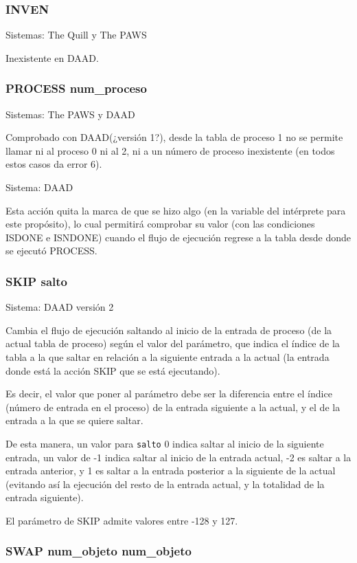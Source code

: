 \documentclass[11pt, a5paper]{article}
\newcommand{\quill}{\textsf{The Quill}\xspace}
\newcommand{\paw}{\textsf{The PAWS}\xspace}
\newcommand{\daad}{\textsf{DAAD}\xspace}
\newcommand{\sistema}[1]{\noindent Sistema: #1 \nopagebreak}
\newcommand{\sistemas}[1]{\noindent Sistemas: #1 \nopagebreak}
\begin{document}
\subsubsection{INVEN}

\sistemas{\quill y \paw}

Inexistente en \daad.

\subsubsection{PROCESS num\_proceso}

\sistemas{\paw y \daad}

Comprobado con \daad (¿versión 1?), desde la tabla de proceso 1 no se permite llamar ni al proceso 0 ni al 2, ni a un número de proceso inexistente (en todos estos casos da error 6).

\sistema{\daad}

Esta acción quita la marca de que se hizo algo (en la variable del intérprete para este propósito), lo cual permitirá comprobar su valor (con las condiciones ISDONE e ISNDONE) cuando el flujo de ejecución regrese a la tabla desde donde se ejecutó PROCESS.

\subsubsection{SKIP salto}

\sistema{\daad versión 2}

Cambia el flujo de ejecución saltando al inicio de la entrada de proceso (de la actual tabla de proceso) según el valor del parámetro, que indica el índice de la tabla a la que saltar en relación a la siguiente entrada a la actual (la entrada donde está la acción SKIP que se está ejecutando).

Es decir, el valor que poner al parámetro debe ser la diferencia entre el índice (número de entrada en el proceso) de la entrada siguiente a la actual, y el de la entrada a la que se quiere saltar.

De esta manera, un valor para \texttt{salto} 0 indica saltar al inicio de la siguiente entrada, un valor de -1 indica saltar al inicio de la entrada actual, -2 es saltar a la entrada anterior, y 1 es saltar a la entrada posterior a la siguiente de la actual (evitando así la ejecución del resto de la entrada actual, y la totalidad de la entrada siguiente).

El parámetro de SKIP admite valores entre -128 y 127.

\subsubsection{SWAP num\_objeto num\_objeto}
\end{document}
